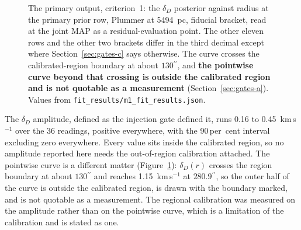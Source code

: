 \documentclass[11pt]{article}
\newcommand{\as}{\ensuremath{^{\prime\prime}}}
\newcommand{\dD}{\ensuremath{\delta_D}}
\begin{document}
\begin{figure}[htbp]
\caption{The primary output, criterion~1: the \dD{} posterior against radius at the primary prior row, Plummer at 5494~pc, fiducial bracket, read at the joint MAP as a residual-evaluation point. The other eleven rows and the other two brackets differ in the third decimal except where Section~\ref{sec:gates-c} says otherwise. The curve crosses the calibrated-region boundary at about $130\as$, and \textbf{the pointwise curve beyond that crossing is outside the calibrated region and is not quotable as a measurement} (Section~\ref{sec:gates-a}). Values from \texttt{fit\_results/m1\_fit\_results.json}.}
\label{fig:deltaD}
\end{figure}

The \dD{} amplitude, defined as the injection gate defined it, runs 0.16 to 0.45~km\,s$^{-1}$ over the 36 readings, positive everywhere, with the 90\,per~cent interval excluding zero everywhere. Every value sits inside the calibrated region, so no amplitude reported here needs the out-of-region calibration attached. The pointwise curve is a different matter (Figure~\ref{fig:deltaD}): $\dD(r)$ crosses the region boundary at about $130\as$ and reaches 1.15~km\,s$^{-1}$ at $280.9\as$, so the outer half of the curve is outside the calibrated region, is drawn with the boundary marked, and is not quotable as a measurement. The regional calibration was measured on the amplitude rather than on the pointwise curve, which is a limitation of the calibration and is stated as one.
\end{document}
